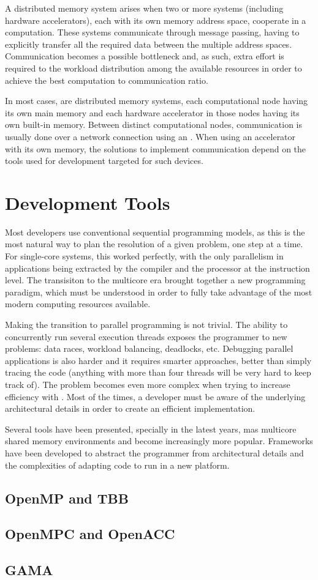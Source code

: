 \documentclass[../thesis]{subfiles}
\begin{document}
		A distributed memory system arises when two or more systems (including hardware accelerators), each with its own memory address space, cooperate in a computation. These systems communicate through message passing, having to explicitly transfer all the required data between the multiple address spaces. Communication becomes a possible bottleneck and, as such, extra effort is required to the workload distribution among the available resources in order to achieve the best computation to communication ratio.

		In most cases, \hetplats are distributed memory systems, each computational node having its own main memory and each hardware accelerator in those nodes having its own built-in memory. Between distinct computational nodes, communication is usually done over a network connection using an \mpi. When using an accelerator with its own memory, the solutions to implement communication depend on the tools used for development targeted for such devices.


		\section{Development Tools}
		Most developers use conventional sequential programming models, as this is the most natural way to plan the resolution of a given problem, one step at a time. For single-core systems, this worked perfectly, with the only parallelism in applications being extracted by the compiler and the processor at the instruction level. The transisiton to the multicore era brought together a new programming paradigm, which must be understood in order to fully take advantage of the most modern computing resources available.

		Making the transition to parallel programming is not trivial. The ability to concurrently run several execution threads exposes the programmer to new problems: data races, workload balancing, deadlocks, etc. Debugging parallel applications is also harder and it requires smarter approaches, better than simply tracing the code (anything with more than four threads will be very hard to keep track of). The problem becomes even more complex when trying to increase efficiency with \hetplats. Most of the times, a developer must be aware of the underlying architectural details in order to create an efficient implementation.

		Several tools have been presented, specially in the latest years, mas multicore shared memory environments and \hetplats become increasingly more popular. Frameworks have been developed to abstract the programmer from architectural details and the complexities of adapting code to run in a new platform.

		\subsection{OpenMP and TBB}
		\subsection{OpenMPC and OpenACC}
		\subsection{GAMA}
\end{document}

